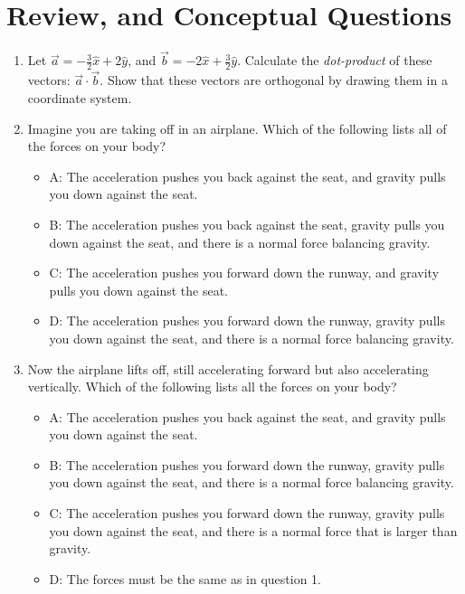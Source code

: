 \documentclass[10pt]{article}
\begin{document}
\maketitle

\section{Review, and Conceptual Questions}
\begin{enumerate}
\item Let $\vec{a} = -\frac{3}{2}\hat{x} + 2\hat{y}$, and $\vec{b} = -2\hat{x} + \frac{3}{2}\hat{y}$.  Calculate the \textit{dot-product} of these vectors: $\vec{a} \cdot \vec{b}$.  Show that these vectors are orthogonal by drawing them in a coordinate system.  \vspace{1.5 cm}
\item Imagine you are taking off in an airplane.  Which of the following lists all of the forces on your body? \\
\begin{itemize}
\item A: The acceleration pushes you back against the seat, and gravity pulls you down against the seat.
\item B: The acceleration pushes you back against the seat, gravity pulls you down against the seat, and there is a normal force balancing gravity.
\item C: The acceleration pushes you forward down the runway, and gravity pulls you down against the seat.
\item D: The acceleration pushes you forward down the runway, gravity pulls you down against the seat, and there is a normal force balancing gravity.
\end{itemize}
\item Now the airplane lifts off, still accelerating forward but also accelerating vertically.  Which of the following lists all the forces on your body? \\
\begin{itemize}
\item A: The acceleration pushes you back against the seat, and gravity pulls you down against the seat.
\item B: The acceleration pushes you forward down the runway, gravity pulls you down against the seat, and there is a normal force balancing gravity.
\item C: The acceleration pushes you forward down the runway, gravity pulls you down against the seat, and there is a normal force that is larger than gravity.
\item D: The forces must be the same as in question 1.
\end{itemize}
\end{enumerate}
\end{document}
